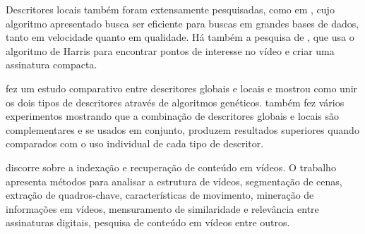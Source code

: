 Descritores locais também foram extensamente pesquisadas, como em \citeauthor{joly2007content}, cujo algoritmo apresentado busca ser eficiente para buscas em grandes bases de dados, tanto em velocidade quanto em qualidade. Há também a  pesquisa de \citeauthor{law2006robust}, que usa o algoritmo de Harris para encontrar pontos de interesse no vídeo e criar uma assinatura compacta.

\citeauthor{de2012combinaccao} fez um estudo comparativo entre descritores globais e locais e mostrou como unir os dois tipos de descritores através de algoritmos genéticos. \citeauthor{de2012combinaccao} também fez vários experimentos mostrando que a combinação de descritores globais e locais são complementares e se usados em conjunto, produzem resultados superiores quando comparados com o uso individual de cada tipo de descritor.

\citeauthor{hu2011survey} discorre sobre a indexação e recuperação de conteúdo em vídeos. O trabalho apresenta métodos para analisar a estrutura de vídeos, segmentação de cenas, extração de quadros-chave, características de movimento, mineração de informações em vídeos, mensuramento de similaridade e relevância entre assinaturas digitais, pesquisa de conteúdo em vídeos entre outros.

